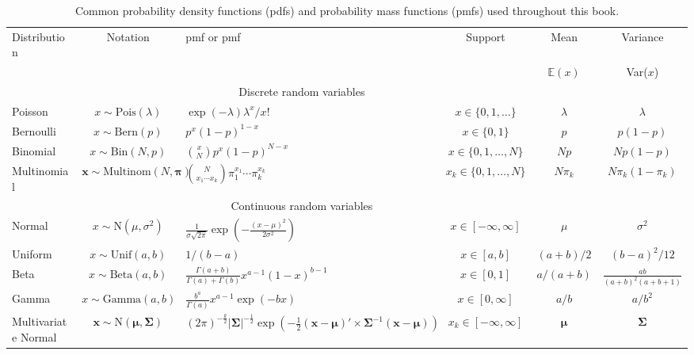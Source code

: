 \begin{table}%
  \caption{Common probability density functions (pdfs) and probability
    mass functions (pmfs) used throughout this book.}
  \begin{tabular}[t]{lcp{4.3cm}ccc}
    \hline
    Distribution & Notation & pmf or pmf & Support & Mean & Variance  \\
                 & & & & $\mathbb{E}(x)$ & Var($x$) \\
    \hline
    \multicolumn{5}{c}{Discrete random variables} \\
    Poisson & $x \sim \text{Pois}(\lambda)$ &
    $\exp(-\lambda)\lambda^x/x!$ & $x \in \{0,1,\ldots\}$ & $\lambda$ & $\lambda$ \\
    Bernoulli & $x \sim \text{Bern}(p)$ & $p^x(1-p)^{1-x}$ & $x \in \{0,1\}$ & $p$ &
    $p(1-p)$  \\
    Binomial & $x \sim \text{Bin}(N, p)$ & $\binom{x}{N}p^x(1-p)^{N-x}$
    & $x \in \{0,1,\ldots,N\}$ & $Np$ & $Np(1-p)$  \\
    Multinomial & $\mathbf{x} \sim \text{Multinom}(N, \bm{\pi})$ &
    $\binom{N}{x_1 \cdots x_k}\pi_1^{x_1} \cdots \pi_k^{x_k}$ & $x_k
    \in \{0,1,\ldots,N\}$ & $N\pi_k$ & $N\pi_k(1-\pi_k)$ \\
    \multicolumn{5}{c}{Continuous random variables} \\
    Normal & $x \sim \text{N}(\mu, \sigma^2)$ & $\frac{1}{\sigma\sqrt{2\pi}}
      \exp(-\frac{(x-\mu)^2}{2\sigma^2})$ & $x \in [-\infty,\infty]$ & $\mu$ & $\sigma^2$  \\
    Uniform & $x \sim \text{Unif}(a, b)$ & $1/(b-a)$ & $x \in [a,b]$ & $(a+b)/2$ &
    $(b-a)^2/12$  \\
    Beta & $x \sim \text{Beta}(a, b)$ &
    $\frac{\Gamma(a+b)}{\Gamma(a)+\Gamma(b)}x^{a-1}
    (1-x)^{b-1}$ & $x \in [0,1]$ & $a/(a+b)$ & $\frac{ab}{(a+b)^2(a+b+1)}$ \\
    Gamma & $x \sim \text{Gamma}(a,b)$ &
    $\frac{b^a}{\Gamma(a)}x^{a-1}\exp(-bx)$ & $x\in [0,\infty]$ & $a/b$ & $a/b^2$  \\
    Multivariate Normal & $\mathbf{x} \sim \text{N}(\bm{\mu}, \bm{\Sigma})$ &
    $(2\pi)^{-\frac{k}{2}}|\bm{\Sigma}|^{-\frac{1}{2}}\exp(-\frac{1}{2}(\mathbf{x}-\bm{\mu})'\times\bm{\Sigma}^{-1}(\mathbf{x}-\bm{\mu}))$
    & $x_k \in [-\infty,\infty]$ & $\bm{\mu}$ & $\bm{\Sigma}$ \\
    \hline
  \end{tabular}
  \label{modeling.tab.pdfs}
\end{table}




